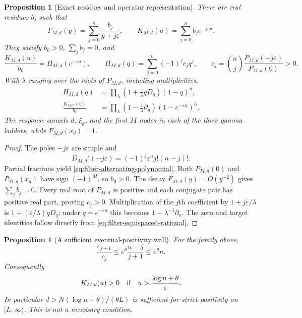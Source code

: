 \documentclass[11pt]{article}
\newtheorem{proposition}[theorem]{Proposition}
\theoremstyle{definition}
\theoremstyle{remark}
\begin{document}
\begin{proposition}[Exact residues and operator representation]
\label{prop:filter-equispaced-residues}
There are real residues $b_j$ such that
\begin{equation}
 F_{M,d}(y)=\sum_{j=0}^{n}\frac{b_j}{y+j\varepsilon},\qquad
 K_{M,d}(u)=\sum_{j=0}^{n}b_je^{-j\varepsilon u}.
 \label{eq:filter-equispaced-laplace}
\end{equation}
They satisfy $b_0>0$, $\sum_jb_j=0$, and
\begin{equation}
 \frac{K_{M,d}(u)}{b_0}=H_{M,d}(e^{-\varepsilon u}),\qquad
 H_{M,d}(q)=\sum_{j=0}^{n}(-1)^jc_jq^j,\qquad
 c_j=\binom nj\frac{P_{M,d}(-j\varepsilon)}{P_{M,d}(0)}>0.
 \label{eq:filter-alternating-polynomial}
\end{equation}
With $\lambda$ ranging over the roots of $P_{M,d}$, including
multiplicities,
\begin{equation}
 \begin{split}
 H_{M,d}(q)
 &=\prod_\lambda\left(1+\frac\varepsilon\lambda qD_q\right)(1-q)^n,\\
 \frac{K_{M,d}(u)}{b_0}
 &=\prod_\lambda\left(1-\frac1\lambda\partial_u\right)
                       (1-e^{-\varepsilon u})^n.
 \end{split}
 \label{eq:filter-equispaced-operators}
\end{equation}
The response cancels $d$, $\xi_d$, and the first $M$ nodes in each of
the three gamma ladders, while $F_{M,d}(x_d)=1$.
\end{proposition}

\begin{proof}
The poles $-j\varepsilon$ are simple and
\[
 D_{M,d}'(-j\varepsilon)
   =(-1)^j\varepsilon^n j!(n-j)!.
\]
Partial fractions yield \eqref{eq:filter-alternating-polynomial}.
Both $P_{M,d}(0)$ and $P_{M,d}(x_d)$ have sign $(-1)^M$,
so $b_0>0$.  The decay $F_{M,d}(y)=O(y^{-2})$ gives
$\sum_jb_j=0$.  Every real root of $P_{M,d}$ is positive and each
conjugate pair has positive real part, proving $c_j>0$.
Multiplication of the $j$th coefficient by $1+j\varepsilon/\lambda$
is $1+(\varepsilon/\lambda)qD_q$; under $q=e^{-\varepsilon u}$
this becomes $1-\lambda^{-1}\partial_u$.  The zero and target
identities follow directly from \eqref{eq:filter-equispaced-rational}.
\end{proof}

\begin{proposition}[A sufficient eventual-positivity wall]
\label{prop:filter-positive-wall}
For the family above,
\begin{equation}
 \frac{c_{j+1}}{c_j}\le e^\theta\frac{n-j}{j+1}\le e^\theta n.
 \label{eq:filter-coefficient-ratio}
\end{equation}
Consequently
\begin{equation}
 K_{M,d}(u)>0\quad\hbox{if}\quad
 u>\frac{\log n+\theta}{\varepsilon}.
 \label{eq:filter-positive-wall}
\end{equation}
In particular $d>N(\log n+\theta)/(\theta L)$ is sufficient for
strict positivity on $[L,\infty)$.  This is not a necessary condition.
\end{proposition}
\end{document}
